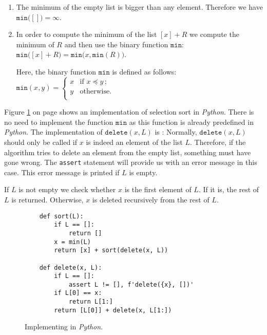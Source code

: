 \begin{enumerate}
\item The minimum of the empty list is bigger than any element.  Therefore we have 
      \\[0.2cm]
      \hspace*{1.3cm} $\mathtt{min}\bigl([]\bigr) = \infty$.
\item In order to compute the minimum of the list $[x] + R$ we compute the minimum of $R$ and
      then use the binary function $\mathtt{min}$: \\[0.2cm]
      \hspace*{1.3cm} 
      $\mathtt{min}\bigl([x] + R\bigr) = \mathtt{min}\bigl(x, \mathtt{min}(R) \bigr)$. 

      Here, the binary function $\mathtt{min}$ is defined as follows: \\[0.2cm]
      \hspace*{1.3cm} 
      $\mathtt{min}(x,y) = \left\{
      \begin{array}{ll}
        x  & \mbox{if $x \preceq y\,$;} \\
        y  & \mbox{otherwise.} \\
      \end{array}\right.
      $
\end{enumerate}
Figure \ref{fig:selection-sort.setlx} on page \pageref{fig:selection-sort.setlx} shows an
implementation of selection sort in \textsl{Python}.  There is no need to implement the function
$\mathtt{min}$ as this function is already predefined in \textsl{Python}. 
The implementation of $\mathtt{delete}(x,L)$ is :  Normally, $\mathtt{delete}(x, L)$
should only be called if $x$ is indeed an element of the list $L$.   Therefore, if the algorithm tries 
to delete an element from the empty list, something must have gone wrong.  The \texttt{assert}
statement will provide us with an error message in this case.  This error message is printed if $L$ is empty.

If $L$ is not empty we check whether $x$ is the first element of $L$.  If it is, the rest of $L$ is
returned.  Otherwise, $x$ is deleted recursively from the rest of $L$.



\begin{figure}[!ht]
  \centering
\begin{verbatim}
    def sort(L):
        if L == []:
            return []
        x = min(L)
        return [x] + sort(delete(x, L))
    
    def delete(x, L):
        if L == []:
            assert L != [], f'delete({x}, [])'
        if L[0] == x:
            return L[1:]
        return [L[0]] + delete(x, L[1:])
\end{verbatim}
\vspace*{-0.3cm}
  \caption{Implementing  in \textsl{Python}.}
  \label{fig:selection-sort.setlx}
\end{figure}

